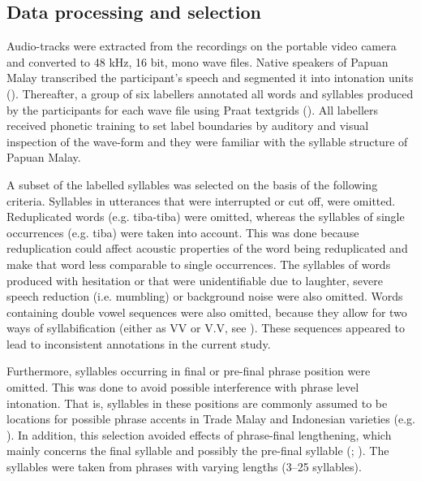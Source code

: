 \subsection{Data processing and selection} \label{sec223}
Audio-tracks were extracted from the recordings on the portable video camera and converted to 48 kHz, 16 bit, mono wave files. Native speakers of Papuan Malay transcribed the participant's speech and segmented it into intonation units (\citealt{chafe_discourse_1994}). Thereafter, a group of six labellers annotated all words and syllables produced by the participants for each wave file using Praat textgrids (\citealt{boersma_praat_2017}). All labellers received phonetic training to set label boundaries by auditory and visual inspection of the wave-form and they were familiar with the syllable structure of Papuan Malay.\par

A subset of the labelled syllables was selected on the basis of the following criteria. Syllables in utterances that were interrupted or cut off, were omitted. Reduplicated words (e.g. tiba-tiba) were omitted, whereas the syllables of single occurrences (e.g. tiba) were taken into account. This was done because reduplication could affect acoustic properties of the word being reduplicated and make that word less comparable to single occurrences. The syllables of words produced with hesitation or that were unidentifiable due to laughter, severe speech reduction (i.e. mumbling) or background noise were also omitted. Words containing double vowel sequences were also omitted, because they allow for two ways of syllabification (either as VV or V.V, see \citealt{kluge_grammar_2017}). These sequences appeared to lead to inconsistent annotations in the current study.\par

Furthermore, syllables occurring in final or pre-final phrase position were omitted. This was done to avoid possible interference with phrase level intonation. That is, syllables in these positions are commonly assumed to be locations for possible phrase accents in Trade Malay and Indonesian varieties (e.g. \citealt{goedemans_no_2014}). In addition, this selection avoided effects of phrase-final lengthening, which mainly concerns the final syllable and possibly the pre-final syllable (\citealt{cambier-langeveld_temporal_2000}; \citealt{shattuck-hufnagel_domain_1998}). The syllables were taken from phrases with varying lengths (3–25 syllables). \par

